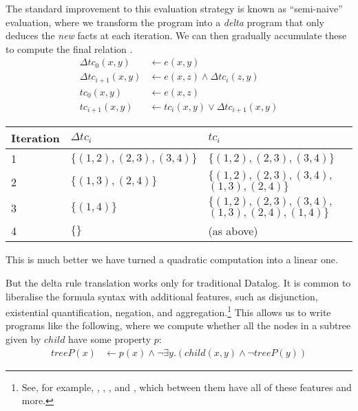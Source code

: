The standard improvement to this evaluation strategy is known as ``semi-naive'' 
evaluation, where we transform 
the program into a \emph{delta} program that only deduces the \emph{new} facts at each
iteration. We can then gradually accumulate these to compute the final relation \autocite[See][section
13.1]{abiteboul1995foundations}.
\begin{align*}
  \Delta tc_{0}(x, y) &\leftarrow e(x, y)\\
  \Delta tc_{i+1}(x, y) &\leftarrow e(x, z) \wedge \Delta tc_i(z, y)\\
  tc_{0}(x, y) &\leftarrow e(x, z)\\
  tc_{i+1}(x, y) &\leftarrow tc_{i}(x,y) \vee \Delta tc_{i+1}(x,y)
\end{align*}

\begin{center}
  \begin{tabular} {p{3.5em} p{8em} p{10em}}
    Iteration & $\Delta tc_i$ & $tc_i$ \\
    \toprule
    1 & $\{ (1, 2), (2, 3), (3, 4) \}$ & $\{ (1, 2), (2, 3), (3, 4) \}$\\
    2 & $\{ (1, 3), (2, 4) \}$ & $\{ (1, 2), (2, 3), (3, 4),$ $(1, 3), (2, 4) \}$\\
    3 & $\{ (1, 4) \}$ & $\{ (1, 2), (2, 3), (3, 4),$ $(1, 3), (2, 4), (1, 4) \}$\\
    4 & $\{ \}$ & (as above) \\
    \bottomrule
  \end{tabular}
\end{center}
\medskip

This is much better \textemdash{} we have turned a quadratic computation into a linear one.

But the delta rule translation works only for traditional Datalog. It is common to
liberalise the formula syntax with additional features, such as disjunction,
existential quantification, negation, and aggregation.\footnote{ See, for
  example, \autocites(LogiQL)(){logicbloxWebsite}{halpin2014logiql},
  \autocites(Datomic)(){datomicWebsite},
  \autocites(Souffle)(){souffleWebsite}{scholz2016fast}, and
  \autocites(DES)(){saenz2011deductive}, which between them have all of these
  features and more. } 
This allows us to write programs like the following, where we compute whether all the
nodes in a subtree given by $child$ have some property $p$:
\begin{align*}
  treeP(x) &\leftarrow p(x) \wedge \neg \exists y . (child(x,y) \wedge \neg treeP(y))
\end{align*}

